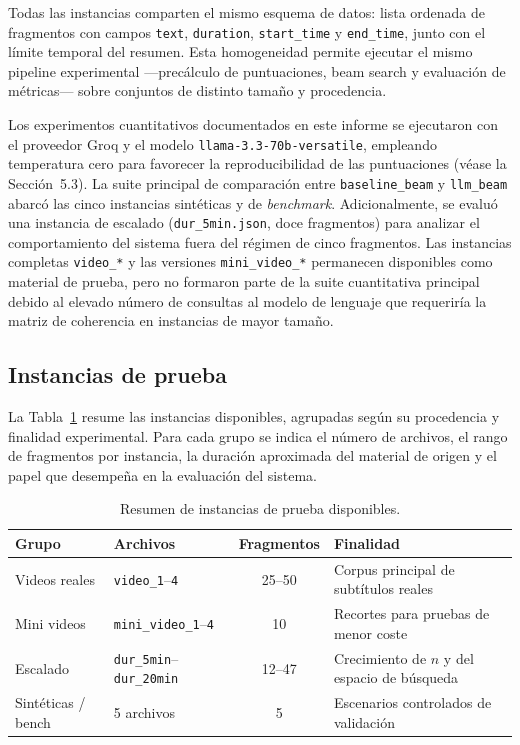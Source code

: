 \documentclass[12pt,a4paper]{article}
\begin{document}
Todas las instancias comparten el mismo esquema de datos: lista ordenada de fragmentos con campos \texttt{text}, \texttt{duration}, \texttt{start\_time} y \texttt{end\_time}, junto con el límite temporal del resumen. Esta homogeneidad permite ejecutar el mismo pipeline experimental ---precálculo de puntuaciones, beam search y evaluación de métricas--- sobre conjuntos de distinto tamaño y procedencia.

Los experimentos cuantitativos documentados en este informe se ejecutaron con el proveedor Groq y el modelo \texttt{llama-3.3-70b-versatile}, empleando temperatura cero para favorecer la reproducibilidad de las puntuaciones (véase la Sección~5.3). La suite principal de comparación entre \texttt{baseline\_beam} y \texttt{llm\_beam} abarcó las cinco instancias sintéticas y de \textit{benchmark}. Adicionalmente, se evaluó una instancia de escalado (\texttt{dur\_5min.json}, doce fragmentos) para analizar el comportamiento del sistema fuera del régimen de cinco fragmentos. Las instancias completas \texttt{video\_*} y las versiones \texttt{mini\_video\_*} permanecen disponibles como material de prueba, pero no formaron parte de la suite cuantitativa principal debido al elevado número de consultas al modelo de lenguaje que requeriría la matriz de coherencia en instancias de mayor tamaño.


\subsection{Instancias de prueba}

La Tabla~\ref{tab:instancias} resume las instancias disponibles, agrupadas según su procedencia y finalidad experimental. Para cada grupo se indica el número de archivos, el rango de fragmentos por instancia, la duración aproximada del material de origen y el papel que desempeña en la evaluación del sistema.

\begin{table}[H]
\centering
\caption{Resumen de instancias de prueba disponibles.}
\label{tab:instancias}

\begin{tabularx}{\textwidth}{@{}l l c X@{}}
\toprule
\textbf{Grupo} & \textbf{Archivos} & \textbf{Fragmentos} & \textbf{Finalidad} \\
\midrule
Videos reales
& \texttt{video\_1}--\texttt{4}
& 25--50
& Corpus principal de subtítulos reales \\

Mini videos
& \texttt{mini\_video\_1}--\texttt{4}
& 10
& Recortes para pruebas de menor coste \\

Escalado
& \texttt{dur\_5min}--\texttt{dur\_20min}
& 12--47
& Crecimiento de \(n\) y del espacio de búsqueda \\

Sintéticas / bench
& 5 archivos
& 5
& Escenarios controlados de validación \\
\bottomrule
\end{tabularx}
\end{table}
\end{document}
